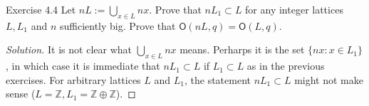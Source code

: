 \begin{idea4}{Exercise 4.4}\leavevmode
Let $nL:=\bigcup_{x\in L} nx$. Prove that $nL_1\subset L$ for any integer lattices $L,L_1$ and $n$ sufficiently big. Prove that $\mathsf{O}(nL,q) =\mathsf{O}(L,q)$.
\end{idea4}

\begin{proof}[Solution]\leavevmode
It is not clear what $\bigcup_{x\in L} nx$ means. Perharps it is the set $\{nx:x\in L_1\}$, in which case it is immediate that $nL_1\subset L$ if $L_1\subset L$ as in the previous exercises. For arbitrary lattices $L$ and $L_1$, the statement $nL_1\subset L$ might not make sense ($L=\mathbb{Z}, L_1=\mathbb{Z}\oplus \mathbb{Z}$).
\end{proof}








